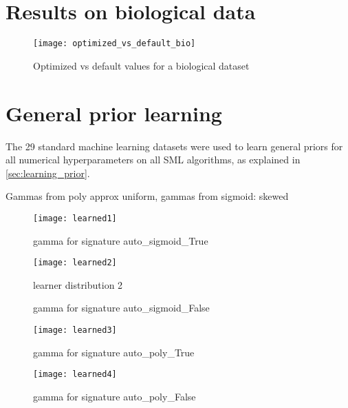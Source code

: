\section{Results on biological data}

\begin{figure}[h!]
	\centering
	\texttt{[image: optimized\_vs\_default\_bio]}
	\caption{Optimized vs default values for a biological dataset}
	\label{img:optvsdefbio}
\end{figure}

\section{General prior learning}

The 29 standard machine learning datasets were used to learn general priors for all numerical
hyperparameters on all SML algorithms, as explained in \ref{sec:learning_prior}. 

Gammas from poly approx uniform, gammas from sigmoid: skewed


\begin{figure}[h!]
	\centering
	\texttt{[image: learned1]}
	\caption{gamma for signature auto\_sigmoid\_True}
	\label{img:learned1}
\end{figure}


\begin{figure}[h!]
	\centering
	\texttt{[image: learned2]}
	\caption{learner distribution 2}
	\caption{gamma for signature auto\_sigmoid\_False}
	\label{img:learned2}
\end{figure}


\begin{figure}[h!]
	\centering
	\texttt{[image: learned3]}
	\caption{gamma for signature auto\_poly\_True}
	\label{img:learned3}
\end{figure}


\begin{figure}[h!]
	\centering
	\texttt{[image: learned4]}
	\caption{gamma for signature auto\_poly\_False}
	\label{img:learned4}
\end{figure}


